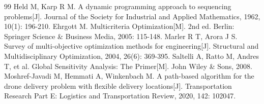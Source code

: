 \documentclass[12pt,a4paper,UTF8]{ctexart}
\begin{document}
\begin{thebibliography}{99}
 Held M, Karp R M. A dynamic programming approach to sequencing problems[J]. Journal of the Society for Industrial and Applied Mathematics, 1962, 10(1): 196-210.
 Ehrgott M. Multicriteria Optimization[M]. 2nd ed. Berlin: Springer Science \& Business Media, 2005: 115-148.
 Marler R T, Arora J S. Survey of multi-objective optimization methods for engineering[J]. Structural and Multidisciplinary Optimization, 2004, 26(6): 369-395.
 Saltelli A, Ratto M, Andres T, et al. Global Sensitivity Analysis: The Primer[M]. John Wiley \& Sons, 2008.
 Moshref-Javadi M, Hemmati A, Winkenbach M. A path-based algorithm for the drone delivery problem with flexible delivery locations[J]. Transportation Research Part E: Logistics and Transportation Review, 2020, 142: 102047.
\end{thebibliography}
\end{document}
